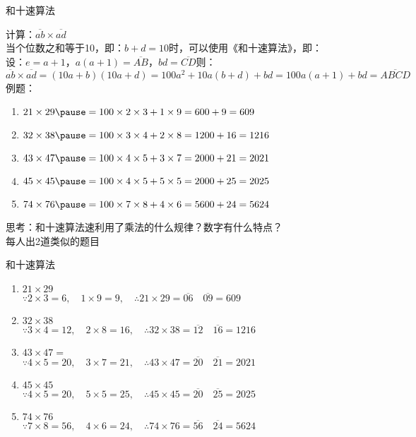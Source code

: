 \documentclass[aspectratio=169]{ctexbeamer} %
\date{\today}
\begin{document}
\begin{frame}[t]{和十速算法}
\begin{spacing}{1.2}
\normalsize
计算：$\overline{ab} \times \overline{ad}$ \\
当个位数之和等于10，即：$b + d = 10$时，可以使用《和十速算法》，即：\\
设：$e = a+1$，$a(a+1)=\overline{AB}$，$bd = \overline {CD}$则：\\
$\overline{ab} \times \overline{ad} = (10a+b)(10a+d) = 100a^2 + 10a(b+d) + bd = 100a(a+1) + bd = \overline{ABCD}$ \\
例题：
\begin{enumerate}[label={\arabic*.}]
\item $21 \times 29 \pause = 100 \times 2 \times 3 + 1 \times 9 = 600 + 9 = 609$
\item $32 \times 38 \pause = 100 \times 3 \times 4 + 2 \times 8 = 1200 + 16 = 1216$
\item $43 \times 47 \pause = 100 \times 4 \times 5 + 3 \times 7 = 2000 + 21 = 2021$
\item $45 \times 45 \pause = 100 \times 4 \times 5 + 5 \times 5 = 2000 + 25 = 2025$
\item $74 \times 76 \pause = 100 \times 7 \times 8 + 4 \times 6 = 5600 + 24 = 5624$
\end{enumerate}
\alert{思考：和十速算法速利用了乘法的什么规律？数字有什么特点？}\\
\alert{每人出2道类似的题目}  \\

\end{spacing}
\end{frame}

\begin{frame}[t]{和十速算法}
\begin{spacing}{1.2}
\normalsize
\begin{enumerate}[label={\arabic*.}]
\item $21 \times 29$ \\
\pause
$ \because 2 \times 3 = 6, \quad 1 \times 9 = 9, \quad \therefore 21 \times 29 = \overline{06} \quad \overline{09} = 609$
\item $32 \times 38$ \\
\pause
$ \because 3 \times 4 = 12, \quad 2 \times 8 = 16, \quad \therefore 32 \times 38 = \overline{12} \quad \overline{16} = 1216$
\item $43 \times 47 = $ \\
\pause
$ \because 4 \times 5 = 20, \quad 3 \times 7 = 21, \quad \therefore 43 \times 47 = \overline{20} \quad \overline{21} = 2021$
\item $45 \times 45$ \\
\pause
$ \because 4 \times 5 = 20, \quad 5 \times 5 = 25, \quad \therefore 45 \times 45 = \overline{20} \quad \overline{25} = 2025$
\item $74 \times 76$ \\
\pause
$ \because 7 \times 8 = 56, \quad 4 \times 6 = 24, \quad \therefore 74 \times 76 = \overline{56} \quad \overline{24} = 5624$
\end{enumerate}


\end{spacing}
\end{frame}
\end{document}

